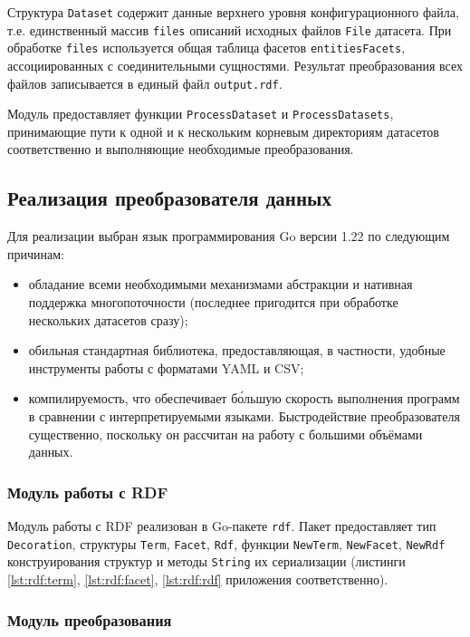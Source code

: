 Структура \texttt{Dataset} содержит данные верхнего уровня конфигурационного файла, т.е.
единственный массив \texttt{files} описаний исходных файлов \texttt{File} датасета. При обработке
\texttt{files} используется общая таблица фасетов \texttt{entitiesFacets}, ассоциированных с
соединительными сущностями. Результат преобразования всех файлов записывается в единый файл
\texttt{output.rdf}.

Модуль предоставляет функции \texttt{ProcessDataset} и \texttt{ProcessDatasets}, принимающие
пути к одной и к нескольким корневым директориям датасетов соответственно и выполняющие необходимые
преобразования.



\subsection{Реализация преобразователя данных}

Для реализации выбран язык программирования Go версии 1.22 по следующим причинам:
\begin{itemize}
    \item обладание всеми необходимыми механизмами абстракции и нативная поддержка многопоточности 
(последнее пригодится при обработке нескольких датасетов сразу);
    \item обильная стандартная библиотека, предоставляющая, в частности, удобные инструменты работы
с форматами YAML и CSV;
    \item компилируемость, что обеспечивает б\'{о}льшую скорость выполнения программ в сравнении с
интерпретируемыми языками. Быстродействие преобразователя существенно, поскольку он рассчитан
на работу с большими объёмами данных. 
\end{itemize}


\subsubsection{Модуль работы с RDF}

Модуль работы с RDF реализован в Go-пакете \texttt{rdf}. Пакет предоставляет тип \texttt{Decoration},
структуры \texttt{Term}, \texttt{Facet}, \texttt{Rdf}, функции \texttt{NewTerm}, \texttt{NewFacet},
\texttt{NewRdf} конструирования структур и методы \texttt{String} их сериализации
(листинги \ref{lst:rdf:term}, \ref{lst:rdf:facet}, \ref{lst:rdf:rdf} приложения соответственно).


\subsubsection{Модуль преобразования}

